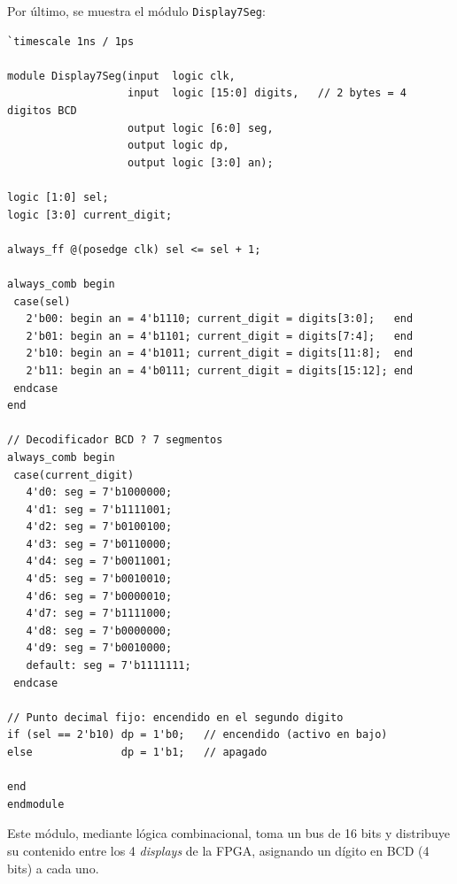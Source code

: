 \documentclass[letterpaper, 12pt]{article}
\begin{document}
Por último, se muestra el módulo \texttt{Display7Seg}:
\begin{lstlisting}
`timescale 1ns / 1ps

module Display7Seg(input  logic clk,
                   input  logic [15:0] digits,   // 2 bytes = 4 digitos BCD
                   output logic [6:0] seg,
                   output logic dp,
                   output logic [3:0] an);

logic [1:0] sel;
logic [3:0] current_digit;

always_ff @(posedge clk) sel <= sel + 1;

always_comb begin
 case(sel)
   2'b00: begin an = 4'b1110; current_digit = digits[3:0];   end
   2'b01: begin an = 4'b1101; current_digit = digits[7:4];   end
   2'b10: begin an = 4'b1011; current_digit = digits[11:8];  end
   2'b11: begin an = 4'b0111; current_digit = digits[15:12]; end
 endcase
end

// Decodificador BCD ? 7 segmentos
always_comb begin
 case(current_digit)
   4'd0: seg = 7'b1000000;
   4'd1: seg = 7'b1111001;
   4'd2: seg = 7'b0100100;
   4'd3: seg = 7'b0110000;
   4'd4: seg = 7'b0011001;
   4'd5: seg = 7'b0010010;
   4'd6: seg = 7'b0000010;
   4'd7: seg = 7'b1111000;
   4'd8: seg = 7'b0000000;
   4'd9: seg = 7'b0010000;
   default: seg = 7'b1111111;
 endcase
 
// Punto decimal fijo: encendido en el segundo digito
if (sel == 2'b10) dp = 1'b0;   // encendido (activo en bajo)
else              dp = 1'b1;   // apagado

end
endmodule
\end{lstlisting}
Este módulo, mediante lógica combinacional, toma un bus de 16 bits y distribuye su contenido entre los 4 \textit{displays} de la FPGA, asignando un dígito en BCD (4 bits) a cada uno.
\end{document}
